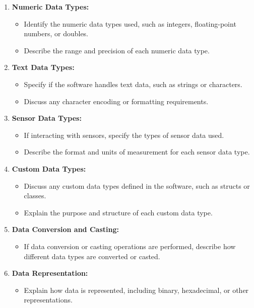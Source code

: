 \begin{enumerate}
	\item \textbf{Numeric Data Types:}
	\begin{itemize}
		\item Identify the numeric data types used, such as integers, floating-point numbers, or doubles.
		\item Describe the range and precision of each numeric data type.
	\end{itemize}
	
	\item \textbf{Text Data Types:}
	\begin{itemize}
		\item Specify if the software handles text data, such as strings or characters.
		\item Discuss any character encoding or formatting requirements.
	\end{itemize}
	
	\item \textbf{Sensor Data Types:}
	\begin{itemize}
		\item If interacting with sensors, specify the types of sensor data used.
		\item Describe the format and units of measurement for each sensor data type.
	\end{itemize}
	
	\item \textbf{Custom Data Types:}
	\begin{itemize}
		\item Discuss any custom data types defined in the software, such as structs or classes.
		\item Explain the purpose and structure of each custom data type.
	\end{itemize}
	
	\item \textbf{Data Conversion and Casting:}
	\begin{itemize}
		\item If data conversion or casting operations are performed, describe how different data types are converted or casted.
	\end{itemize}
	
	\item \textbf{Data Representation:}
	\begin{itemize}
		\item Explain how data is represented, including binary, hexadecimal, or other representations.
	\end{itemize}
\end{enumerate}



